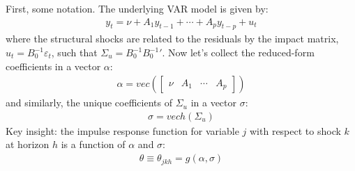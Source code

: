 First, some notation.
The underlying VAR model is given by:
\begin{align*}
y_t = \nu + A_1 y_{t-1} + \cdots  + A_p y_{t-p} + u_t
\end{align*}
where the structural shocks are related to the residuals by the impact matrix, \(u_t=B_0^{-1} \varepsilon_t\),
  such that \(\Sigma_u = B_0^{-1} {B_0^{-1}}'\).
Now let's collect the reduced-form coefficients in a vector \(\alpha \):
\begin{align*}
  \alpha = vec\left(\begin{bmatrix} \nu & A_1 & \cdots  & A_p  \end{bmatrix} \right)
\end{align*}
and similarly, the unique coefficients of \(\Sigma_u\) in a vector \(\sigma \):
\begin{align*}
  \sigma = vech\left(\Sigma_u\right)
\end{align*}
Key insight: the impulse response function for variable \(j\) with respect to shock \(k\) at horizon \(h\) is a function of \(\alpha \) and \(\sigma \):
\begin{align*}
\theta \equiv \theta_{jkh} = g(\alpha,\sigma)
\end{align*}

